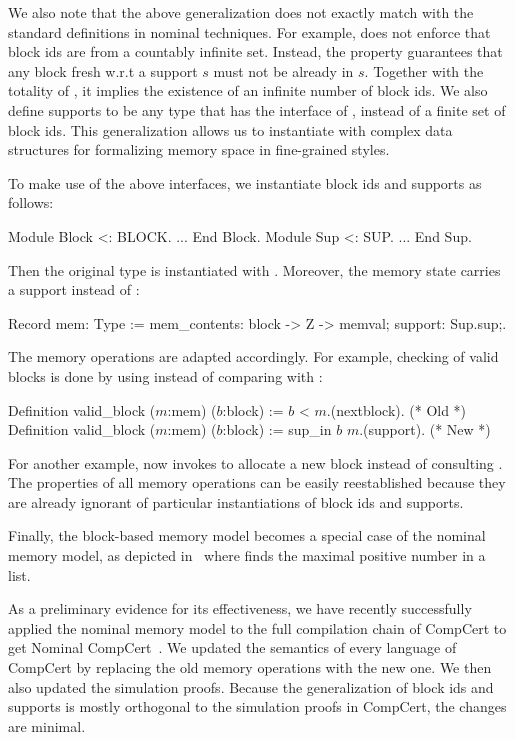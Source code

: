 We also note that the above generalization does not exactly match with the
standard definitions in nominal techniques. For example,  does not
enforce that block ids are from a countably infinite set. Instead,
the  property guarantees that any block fresh w.r.t a
support $s$ must not be already in $s$. Together with the totality of
, it implies the existence of an infinite number of
block ids.
%
We also define supports to be any type that has the interface of
, instead of a finite set of block ids. This generalization
allows us to instantiate  with complex data structures for
formalizing memory space in fine-grained styles. 

To make use of the above interfaces, we instantiate block ids and
supports as follows:
%
\begin{coq}
  Module Block <: BLOCK. ... End Block.           Module Sup <: SUP. ... End Sup.
\end{coq}
%
Then the original  type is instantiated with
. Moreover, the memory state carries a support instead of
\nextblock:
%
\begin{coq}
  Record mem: Type := { mem_contents: block -> Z -> memval;   support: Sup.sup;}.
\end{coq}
%
The memory operations are adapted accordingly. For example, checking
of valid blocks is done by using  instead of comparing
with \nextblock:
%
\begin{coq}
  Definition valid_block ($m$:mem) ($b$:block) := $b$ < $m$.(nextblock).   (* Old *)
  Definition valid_block ($m$:mem) ($b$:block) := sup_in $b$ $m$.(support).  (* New *)
\end{coq}
%
For another example,  now invokes  to
allocate a new block instead of consulting \nextblock.
The properties of all memory operations can be easily reestablished
because they are already ignorant of particular instantiations of block ids
and supports. 

Finally, the block-based memory model becomes a special case of the
nominal memory model, as depicted in~ where
 finds the maximal positive number in a list.

As a preliminary evidence for its effectiveness, we have recently
successfully applied the nominal memory model to the full compilation
chain of CompCert to get Nominal CompCert~\cite{wang2022}.  We updated
the semantics of every language of CompCert by replacing the old
memory operations with the new one. We then also updated the
simulation proofs. Because the generalization of block ids and
supports is mostly orthogonal to the simulation proofs in CompCert,
the changes are minimal.

